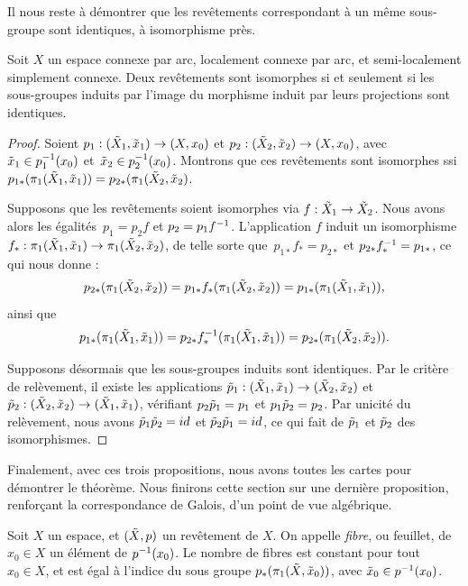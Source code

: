 Il nous reste à démontrer que les revêtements correspondant à un même sous-groupe sont identiques, à isomorphisme près.

\begin{proposition}
Soit $X$ un espace connexe par arc, localement connexe par arc, et semi-localement simplement connexe. Deux revêtements sont isomorphes si et seulement si les sous-groupes induits par l'image du morphisme induit par leurs projections sont identiques.
\end{proposition}

\begin{proof}
Soient $p_1:(\Tilde{X}_1,\Tilde{x}_1)\to (X,x_0)$ et $p_2:(\Tilde{X}_2,\Tilde{x}_2)\to (X,x_0)$, avec~$\Tilde{x}_1\in p_1^{-1}(x_0)$ et~${\Tilde{x}_2\in p_2^{-1}(x_0)}$. Montrons que ces revêtements sont isomorphes ssi ${p_{1\ast}(\pi_1(\Tilde{X}_1,\Tilde{x}_1))=p_{2\ast}(\pi_1(\Tilde{X}_2,\Tilde{x}_2)}$.

Supposons que les revêtements soient isomorphes via $f:\Tilde{X}_1\to \Tilde{X}_2$. Nous avons alors les égalités~${p_1=p_2f}$ et $p_2=p_1f^{-1}$. L'application $f$ induit un isomorphisme $f_\ast:\pi_1(\Tilde{X}_1,\Tilde{x}_1)\to \pi_1(\Tilde{X}_2,\Tilde{x}_2)$, de telle sorte que~$p_{1\ast}f_\ast=p_{2\ast}$ et $p_{2\ast}f^{-1}_\ast=p_{1\ast}$, ce qui nous donne : \[p_{2\ast}(\pi_1(\Tilde{X}_2,\Tilde{x}_2))=p_{1\ast}f_\ast(\pi_1(\Tilde{X}_2,\Tilde{x}_2))=p_{1\ast}(\pi_1(\Tilde{X}_1,\Tilde{x}_1)),\] ainsi que \[p_{1\ast}(\pi_1(\Tilde{X}_1,\Tilde{x}_1))=p_{2\ast}f^{-1}_\ast(\pi_1(\Tilde{X}_1,\Tilde{x}_1))=p_{2\ast}(\pi_1(\Tilde{X}_2,\Tilde{x}_2)).\]

Supposons désormais que les sous-groupes induits sont identiques. Par le critère de relèvement, il existe  les applications $\Tilde{p}_1:(\Tilde{X}_1,\Tilde{x}_1)\to(\Tilde{X}_2,\Tilde{x}_2)$ et $\Tilde{p}_2:(\Tilde{X}_2,\Tilde{x}_2)\to(\Tilde{X}_1,\Tilde{x}_1)$, vérifiant $p_2\Tilde{p}_1=p_1$ et $p_1\Tilde{p}_2=p_2$. Par unicité du relèvement, nous avons $\Tilde{p}_1\Tilde{p}_2=id$ et $\Tilde{p}_2\Tilde{p}_1=id$, ce qui fait de $\Tilde{p}_1$ et $\Tilde{p}_2$ des isomorphismes.
\end{proof}

Finalement, avec ces trois propositions, nous avons toutes les cartes pour démontrer le théorème. Nous finirons cette section sur une dernière proposition, renforçant la correspondance de Galois, d'un point de vue algébrique.

\begin{proposition}
Soit $X$ un espace, et $(\Tilde{X},p)$ un revêtement de $X$. On appelle \emph{fibre}, ou feuillet, de~$x_0\in X$ un élément de $p^{-1}(x_0)$. Le nombre de fibres est constant pour tout $x_0\in X$, et est égal à l'indice du sous groupe $p_\ast(\pi_1(\Tilde{X},\Tilde{x}_0))$, avec $\Tilde{x}_0\in p^{-1}(x_0)$.
\end{proposition}

